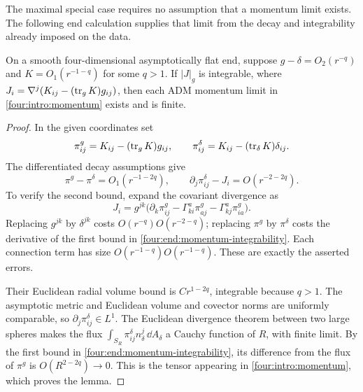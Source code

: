 The maximal special case requires no assumption that a momentum limit
exists. The following end calculation supplies that limit from the
decay and integrability already imposed on the data.

\begin{lemma}\label{four:lem:momentum-exists}
On a smooth four-dimensional asymptotically flat end, suppose
$g-\delta=O_2(r^{-q})$ and $K=O_1(r^{-1-q})$ for some $q>1$.
If $|J|_g$ is integrable, where
$J_i=\nabla^j(K_{ij}-(\operatorname{tr}_gK)g_{ij})$, then each ADM momentum
limit in \eqref{four:intro:momentum} exists and is finite.
\end{lemma}

\begin{proof}
In the given coordinates set
\[
 \pi^g_{ij}=K_{ij}-(\operatorname{tr}_gK)g_{ij},\qquad
 \pi^\delta_{ij}=K_{ij}-(\operatorname{tr}_\delta K)\delta_{ij}.
\]
The differentiated decay assumptions give
\begin{equation}\label{four:end:momentum-integrability}
 \pi^g-\pi^\delta=O_1(r^{-1-2q}),\qquad
 \partial_j\pi^\delta_{ij}-J_i=O(r^{-2-2q}).
\end{equation}
To verify the second bound, expand the covariant divergence as
\[
 J_i=g^{jk}\bigl(\partial_k\pi^g_{ij}
       -\Gamma^a_{ki}\pi^g_{aj}-\Gamma^a_{kj}\pi^g_{ia}\bigr).
\]
Replacing $g^{jk}$ by $\delta^{jk}$ costs
$O(r^{-q})O(r^{-2-q})$; replacing $\pi^g$ by $\pi^\delta$
costs the derivative of the first bound in
\eqref{four:end:momentum-integrability}. Each connection term has size
$O(r^{-1-q})O(r^{-1-q})$. These are exactly the asserted errors.

Their Euclidean radial volume bound is $Cr^{1-2q}$, integrable because
$q>1$. The asymptotic metric and Euclidean volume and covector norms
are uniformly comparable, so $\partial_j\pi^\delta_{ij}\in L^1$.
The Euclidean divergence theorem between two large spheres makes
the flux $\int_{S_R}\pi^\delta_{ij}n_\delta^j\,\dd A_\delta$
a Cauchy function of $R$, with finite limit. By the first bound in
\eqref{four:end:momentum-integrability}, its difference from the flux
of $\pi^g$ is $O(R^{2-2q})\to0$. This is the tensor appearing
in \eqref{four:intro:momentum}, which proves the lemma.
\end{proof}

